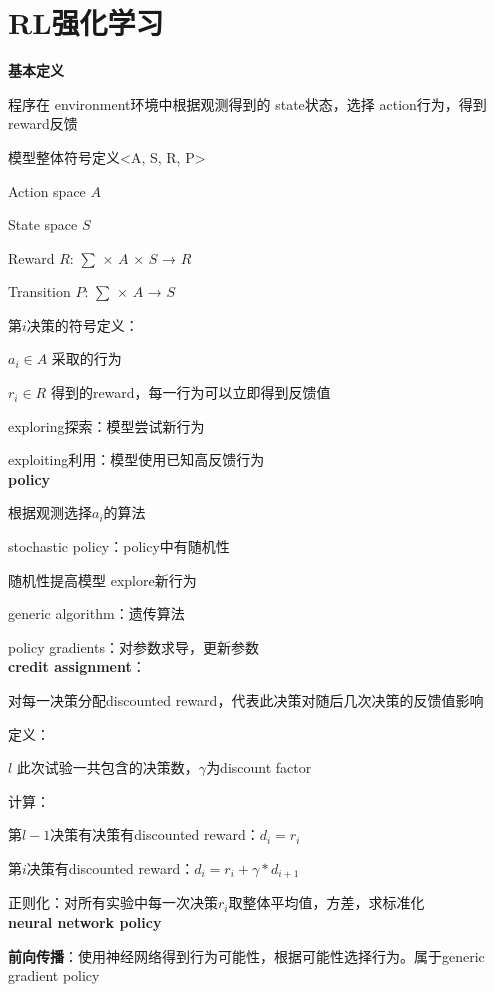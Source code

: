 \documentclass[UTF8]{ctexart}
\begin{document}
\section{RL强化学习}
\noindent \textbf{基本定义}

  程序在 environment环境中根据观测得到的 state状态，选择 action行为，得到reward反馈

  模型整体符号定义<A, S, R, P>

  \quad Action space $A$
  
  \quad State space $S$
  
  \quad Reward $R$: $\sum$ × $A$ × $S$ → $R$
  
  \quad Transition $P$: $\sum$ × $A$ → $S$

  第$i$决策的符号定义：

  \quad $a_i \in A$ 采取的行为

  \quad $r_i \in R$ 得到的reward，每一行为可以立即得到反馈值
  
  exploring探索：模型尝试新行为
  
  exploiting利用：模型使用已知高反馈行为\\
\textbf{policy}

  根据观测选择$a_i$的算法

  stochastic policy：policy中有随机性

  \quad 随机性提高模型 explore新行为

  generic algorithm：遗传算法

  policy gradients：对参数求导，更新参数\\
\textbf{credit assignment}：

  对每一决策分配discounted reward，代表此决策对随后几次决策的反馈值影响

  定义：

  \quad $l$ 此次试验一共包含的决策数，$\gamma$为discount factor

  计算：

  \quad 第$l-1$决策有决策有discounted reward：$d_i = r_i$
  
  \quad 第$i$决策有discounted reward：$d_i = r_i + \gamma * d_{i+1}$
  
  \quad 正则化：对所有实验中每一次决策$r_i$取整体平均值，方差，求标准化\\
\textbf{neural network policy}

  \textbf{前向传播}：使用神经网络得到行为可能性，根据可能性选择行为。属于generic gradient policy
\end{document}
